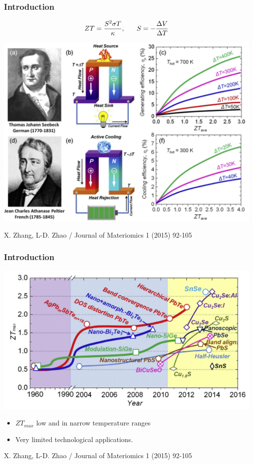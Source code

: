 \documentclass{beamer}
\begin{document}
\begin{frame}

\frametitle{Introduction}
\vspace{-0.5cm}
\begin{equation}
ZT=\frac{S^{2}\sigma T}{\kappa}, \hspace{0.6cm} S=-\frac{\Delta V}{\Delta T}%
\nonumber
\end{equation}
\begin{center}
\includegraphics[width=0.7\linewidth]{Pictures/INTRO/generation-cooling.png}
\end{center}
\vspace{-0.1cm}
\begin{tiny}
X. Zhang, L-D. Zhao / Journal of Materiomics 1 (2015) 92-105
\end{tiny}

\end{frame}

\begin{frame}

\frametitle{Introduction}
\vspace{-0.5cm}
\begin{center}
\includegraphics[width=0.7\linewidth]{Pictures/INTRO/ztvstemp.png}
\end{center}
\vspace{-0.1cm}
\begin{itemize}
\item $ZT_{max}$ low and in narrow temperature ranges
\item Very limited technological applications.
\end{itemize}
\begin{tiny}
X. Zhang, L-D. Zhao / Journal of Materiomics 1 (2015) 92-105
\end{tiny}

\end{frame}
\end{document}
